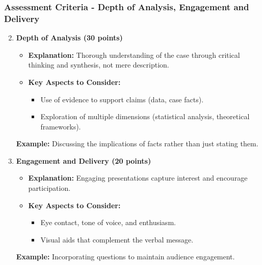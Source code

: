 \documentclass[aspectratio=169]{beamer}
\begin{document}
\begin{frame}[fragile]
    \frametitle{Assessment Criteria - Depth of Analysis, Engagement and Delivery}
    \begin{enumerate}
        \setcounter{enumi}{1} %
        \item \textbf{Depth of Analysis (30 points)}
        \begin{itemize}
            \item \textbf{Explanation:} Thorough understanding of the case through critical thinking and synthesis, not mere description.
            \item \textbf{Key Aspects to Consider:}
            \begin{itemize}
                \item Use of evidence to support claims (data, case facts).
                \item Exploration of multiple dimensions (statistical analysis, theoretical frameworks).
            \end{itemize}
        \end{itemize}
        
        \textbf{Example:} Discussing the implications of facts rather than just stating them.
        
        \item \textbf{Engagement and Delivery (20 points)}
        \begin{itemize}
            \item \textbf{Explanation:} Engaging presentations capture interest and encourage participation.
            \item \textbf{Key Aspects to Consider:}
            \begin{itemize}
                \item Eye contact, tone of voice, and enthusiasm.
                \item Visual aids that complement the verbal message.
            \end{itemize}
        \end{itemize}

        \textbf{Example:} Incorporating questions to maintain audience engagement.
    \end{enumerate}
\end{frame}
\end{document}
